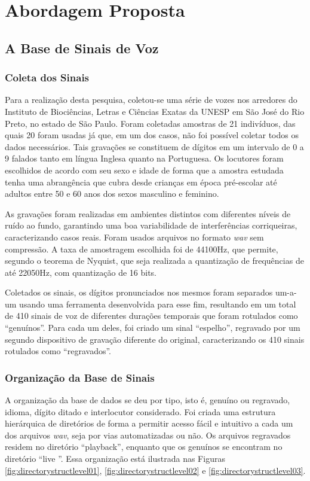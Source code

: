 \chapter{Abordagem Proposta} \label{chap:propApproach}
	\section{A Base de Sinais de Voz}
	    \subsection{Coleta dos Sinais}
		\par Para a realização desta pesquisa, coletou-se uma série de vozes nos arredores do Instituto de Biociências, Letras e Ciências Exatas da UNESP em São José do Rio Preto, no estado de São Paulo. Foram coletadas amostras de 21 indivíduos, das quais 20 foram usadas já que, em um dos casos, não foi possível coletar todos os dados necessários. Tais gravações se constituem de dígitos em um intervalo de 0 a 9 falados tanto em língua Inglesa quanto na Portuguesa. Os locutores foram escolhidos de acordo com seu sexo e idade de forma que a amostra estudada tenha uma abrangência que cubra desde crianças em época pré-escolar até adultos entre 50 e 60 anos dos sexos masculino e feminino.
					
		\par As gravações foram realizadas em ambientes distintos com diferentes níveis de ruído ao fundo, garantindo uma boa variabilidade de interferências corriqueiras, caracterizando casos reais. Foram usados arquivos no formato \textit{wav} sem compressão. A taxa de amostragem escolhida foi de 44100Hz, que permite, segundo o teorema de Nyquist, que seja realizada a quantização de frequências de até 22050Hz, com quantização de 16 bits.
		
		\par Coletados os sinais, os dígitos pronunciados nos mesmos foram separados um-a-um usando uma ferramenta desenvolvida para esse fim, resultando em um total de 410 sinais de voz de diferentes durações temporais que foram rotulados como ``genuínos''. Para cada um deles, foi criado um sinal ``espelho'',  regravado por um segundo dispositivo de gravação diferente do original, caracterizando os 410 sinais rotulados como ``regravados''.

	    \subsection{Organização da Base de Sinais}
		\par A organização da base de dados se deu por tipo, isto é, genuíno ou regravado, idioma, dígito ditado e interlocutor considerado. Foi criada uma estrutura hierárquica de diretórios de forma a permitir acesso fácil e intuitivo a cada um dos arquivos \textit{wav}, seja por vias automatizadas ou não. Os arquivos regravados residem no diretório ``playback'', enquanto que os genuínos se encontram no diretório ``live ''.	Essa organização está ilustrada nas Figuras \ref{fig:directorystructlevel01}, \ref{fig:directorystructlevel02} e \ref{fig:directorystructlevel03}.
		
